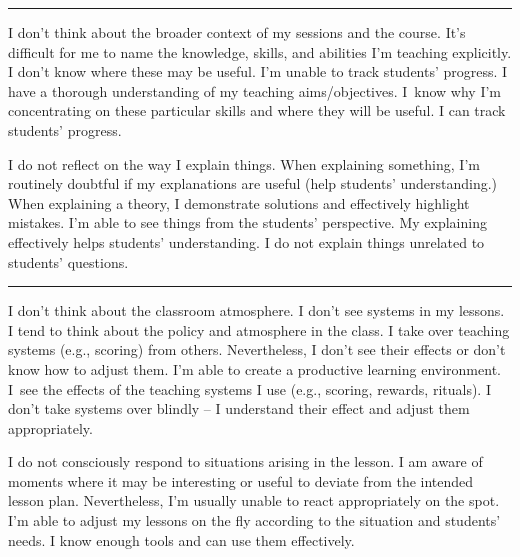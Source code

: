 \rule{\textwidth}{0.4pt}
{I don't think about the broader context of my sessions and the course.}
{It's difficult for me to name the knowledge, skills, and abilities I'm teaching explicitly. I don't know where these may be useful. I'm unable to track students' progress.}
{I have a thorough understanding of my teaching aims/objectives. I~know why I'm concentrating on these particular skills and where they will be useful. I can track students' progress.}
\vspace*{-1em}

\newpage
{}
{I do not reflect on the way I explain things.}
{When explaining something, I'm routinely doubtful if my explanations are useful (help students' understanding.)}
{When explaining a theory, I demonstrate solutions and effectively highlight mistakes. I'm able to see things from the students' perspective. My explaining effectively helps students' understanding. I do not explain things unrelated to students' questions.}

\rule{\textwidth}{0.4pt}
{I don't think about the classroom atmosphere. I don't see systems in my lessons.}
{I tend to think about the policy and atmosphere in the class. I take over teaching systems
(e.g., scoring) from others. Nevertheless, I don't see their effects or don't know how to adjust them.}
{I'm able to create a productive learning environment. I~see the effects of the teaching systems
I use (e.g., scoring, rewards, rituals). I don't take systems over blindly -- I understand their effect and adjust them appropriately.}

\newpage
{I do not consciously respond to situations arising in the lesson.}
{I am aware of moments where it may be interesting or useful to deviate from the intended lesson plan. Nevertheless, I'm usually unable to react appropriately on the spot.}
{I'm able to adjust my lessons on the fly according to the situation and students' needs. I know enough tools and can use them effectively.}

